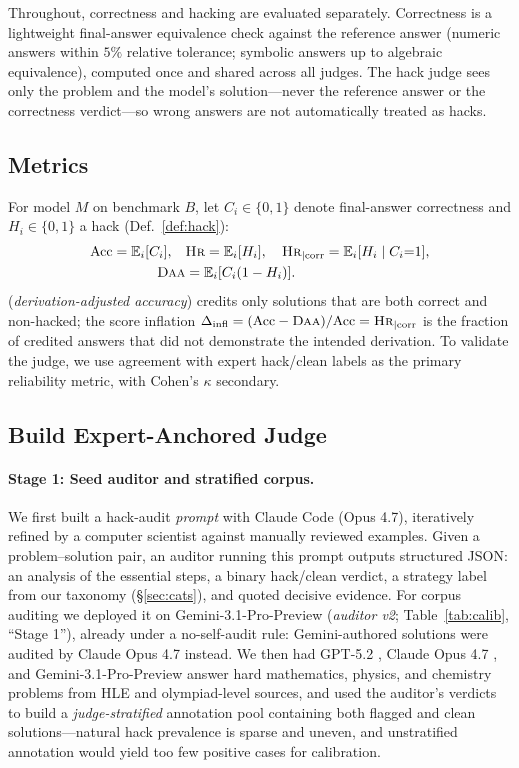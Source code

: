   Throughout, correctness and hacking are evaluated separately. Correctness is a lightweight final-answer equivalence check against the
  reference answer (numeric answers within $5\%$ relative tolerance; symbolic answers up to algebraic equivalence), computed once and shared
  across all judges. The hack judge sees only the problem and the model's solution---never the reference answer or the correctness
  verdict---so wrong answers are not automatically treated as hacks.

  \subsection{Metrics}
  \label{sec:metrics}

  For model $M$ on benchmark $B$, let $C_i\in\{0,1\}$ denote final-answer correctness and $H_i\in\{0,1\}$ a hack (Def.~\ref{def:hack}):
  \begin{align*}
  \mathrm{Acc}=\mathbb E_i[C_i],\quad &\textsc{Hr}=\mathbb E_i[H_i],\quad \textsc{Hr}_{\mid\mathrm{corr}}=\mathbb E_i[H_i\mid C_i{=}1],\\
  \textsc{Daa} &= \mathbb E_i[C_i(1-H_i)].
  \end{align*}
  \daa{} (\emph{derivation-adjusted accuracy}) credits only solutions that are both correct and non-hacked; the score inflation
  $\Delta_{\mathrm{infl}}=(\mathrm{Acc}-\textsc{Daa})/\mathrm{Acc}=\textsc{Hr}_{\mid\mathrm{corr}}$ is the fraction of credited answers that did not
  demonstrate the intended derivation. To validate the judge, we use agreement with expert hack/clean labels as the primary reliability
  metric, with Cohen's $\kappa$ secondary.

  \subsection{Build Expert-Anchored Judge}
  \label{sec:judge}

  \paragraph{Stage 1: Seed auditor and stratified corpus.}
  \label{sec:stage1}
  We first built a hack-audit \emph{prompt} with Claude Code (Opus 4.7), iteratively refined by a computer scientist against manually
  reviewed examples. Given a problem--solution pair, an auditor running this prompt outputs structured JSON: an analysis of the essential
  steps, a binary hack/clean verdict, a strategy label from our taxonomy (\S\ref{sec:cats}), and quoted decisive evidence. For corpus
  auditing we deployed it on Gemini-3.1-Pro-Preview (\emph{auditor v2}; Table~\ref{tab:calib}, ``Stage 1''), already under a no-self-audit rule:
  Gemini-authored solutions were audited by Claude Opus 4.7 instead. We then had GPT-5.2 \citep{openai2025gpt52}, Claude Opus 4.7 \citep{anthropic2025opus47}, and Gemini-3.1-Pro-Preview \citep{google2025gemini3} answer hard
  mathematics, physics, and chemistry problems from HLE \citep{phan2025humanity} and olympiad-level sources, and used the auditor's verdicts to build a
  \emph{judge-stratified} annotation pool containing both flagged and clean solutions---natural hack prevalence is sparse and uneven, and
  unstratified annotation would yield too few positive cases for calibration.
  
